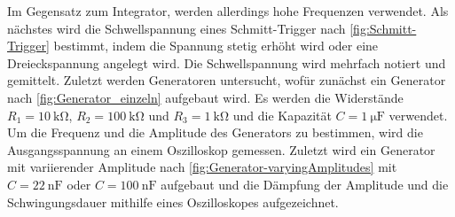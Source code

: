 Im Gegensatz zum Integrator, werden allerdings hohe Frequenzen verwendet. \newline
Als nächstes wird die Schwellspannung eines Schmitt-Trigger nach \autoref{fig:Schmitt-Trigger} bestimmt, indem die Spannung stetig erhöht wird oder eine Dreieckspannung angelegt wird.
Die Schwellspannung wird mehrfach notiert und gemittelt. \newline
Zuletzt werden Generatoren untersucht, wofür zunächst ein Generator nach \autoref{fig:Generator_einzeln} aufgebaut wird.
Es werden die Widerstände $R_1=\SI{10}{\kilo\ohm}$, $R_2=\SI{100}{\kilo\ohm}$ und $R_3=\SI{1}{\kilo\ohm}$ und die Kapazität $C=\SI{1}{\micro\farad}$ verwendet.
Um die Frequenz und die Amplitude des Generators zu bestimmen, wird die Ausgangsspannung an einem Oszilloskop gemessen. \newline
Zuletzt wird ein Generator mit variierender Amplitude nach \autoref{fig:Generator-varyingAmplitudes} mit $C=\SI{22}{\nano\farad}$ oder $C=\SI{100}{\nano\farad}$ aufgebaut und die Dämpfung der Amplitude und die Schwingungsdauer mithilfe eines Oszilloskopes aufgezeichnet.